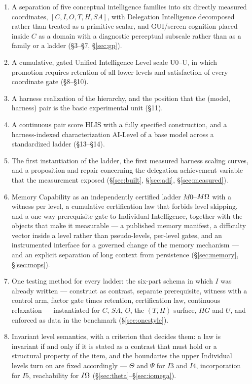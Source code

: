 \begingroup\sloppy
\begin{enumerate}
\item A separation of five conceptual intelligence families into six directly measured coordinates,
      $[C,I,O,T,H,SA]$, with Delegation Intelligence decomposed rather than treated as a primitive scalar, and GUI/screen cognition placed inside $C$ as a domain with a diagnostic perceptual subscale rather than as a family or a ladder (\S3--\S7, \S\ref{sec:gp}).
\item A cumulative, gated Unified Intelligence Level scale U0--U\Om{}, in which promotion requires retention of all lower levels and satisfaction of every coordinate gate (\S8--\S10).
\item A harness realization of the hierarchy, and the position that the (model, harness) pair is the basic experimental unit (\S11).
\item A continuous pair score HLIS with a fully specified construction, and a harness-indexed characterization AI-Level of a base model across a standardized ladder (\S13--\S14).
\item The first instantiation of the ladder, the first measured harness scaling curves, and a proposition and repair concerning the delegation achievement variable that the measurement exposed (\S\ref{sec:built}, \S\ref{sec:adi}, \S\ref{sec:measured}).
\item Memory Capability as an independently certified ladder $M0$--$M\Omega{}$ with a witness per level, a cumulative certification law that forbids level skipping, and a one-way prerequisite gate to Individual Intelligence, together with the objects that make it measurable --- a published memory manifest, a difficulty vector inside a level rather than pseudo-levels, per-level gates, and an instrumented interface for a governed change of the memory mechanism --- and an explicit separation of long context from persistence (\S\ref{sec:memory}, \S\ref{sec:mops}).
\item One testing method for every ladder: the six-part schema in which $I$ was already written --- construct as contrast, separate prerequisite, witness with a control arm, factor gate times retention, certification law, continuous relaxation --- instantiated for $C$, $SA$, $O$, the $(T,H)$ surface, $HG$ and $U$, and enforced as data in the benchmark (\S\ref{sec:onestyle}).
\item Invariant level semantics, with a criterion that decides them: a law is invariant if and only if it is stated as a contrast that must hold or a structural property of the item, and the boundaries the upper Individual levels turn on are fixed accordingly --- $\Theta$ and $\Psi$ for $I3$ and $I4$, incorporation for $I5$, reachability for $I\Omega{}$ (\S\ref{sec:theta}--\S\ref{sec:iomega}).

\end{enumerate}
